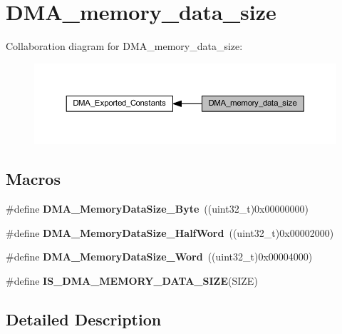 \hypertarget{group___d_m_a__memory__data__size}{}\section{D\+M\+A\+\_\+memory\+\_\+data\+\_\+size}
\label{group___d_m_a__memory__data__size}
Collaboration diagram for D\+M\+A\+\_\+memory\+\_\+data\+\_\+size\+:
\nopagebreak
\begin{figure}[H]
\begin{center}
\leavevmode
\includegraphics[width=350pt]{group___d_m_a__memory__data__size}
\end{center}
\end{figure}
\subsection*{Macros}
\begin{DoxyCompactItemize}
\item 
\mbox{\label{group___d_m_a__memory__data__size_gad6093bccb60ff9adf81e21c73c58ba17}} 
\#define {\bfseries D\+M\+A\+\_\+\+Memory\+Data\+Size\+\_\+\+Byte}~((uint32\+\_\+t)0x00000000)
\item 
\mbox{\label{group___d_m_a__memory__data__size_ga74c9b4e547f5eaaf35d4fd3d01ed5741}} 
\#define {\bfseries D\+M\+A\+\_\+\+Memory\+Data\+Size\+\_\+\+Half\+Word}~((uint32\+\_\+t)0x00002000)
\item 
\mbox{\label{group___d_m_a__memory__data__size_gaff403722a6f82d4b34c9ef306507bb98}} 
\#define {\bfseries D\+M\+A\+\_\+\+Memory\+Data\+Size\+\_\+\+Word}~((uint32\+\_\+t)0x00004000)
\item 
\#define {\bfseries I\+S\+\_\+\+D\+M\+A\+\_\+\+M\+E\+M\+O\+R\+Y\+\_\+\+D\+A\+T\+A\+\_\+\+S\+I\+ZE}(S\+I\+ZE)
\end{DoxyCompactItemize}


\subsection{Detailed Description}


